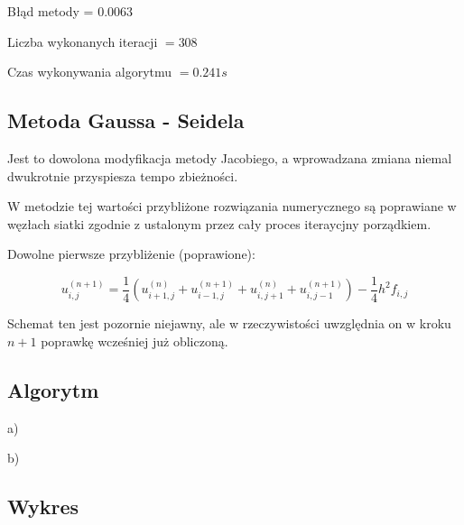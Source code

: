 Błąd metody = $    0.0063$

Liczba wykonanych iteracji $ = 308 $

Czas wykonywania algorytmu $ = 0.241s$


\subsection{Metoda Gaussa - Seidela	}

Jest to dowolona modyfikacja metody Jacobiego, a wprowadzana zmiana niemal dwukrotnie przyspiesza tempo zbieżności.

W metodzie tej wartości przybliżone rozwiązania numerycznego są poprawiane w węzłach siatki zgodnie z ustalonym przez cały proces iteraycjny porządkiem.

Dowolne pierwsze przybliżenie (poprawione):

$$u_{i,j}^{(n+1)} = \frac{1}{4}(u_{i+1,j}^{(n)} + u_{i-1,j}^{(n+1)} + u_{i,j+1}^{(n)} + u_{i,j-1}^{(n+1)}) - \frac{1}{4}h^2f_{i,j}$$

Schemat ten jest pozornie niejawny, ale w rzeczywistości uwzględnia on w kroku $n+1$ poprawkę wcześniej już obliczoną.

\subsection{Algorytm}

a)

b)

\subsection{Wykres}




